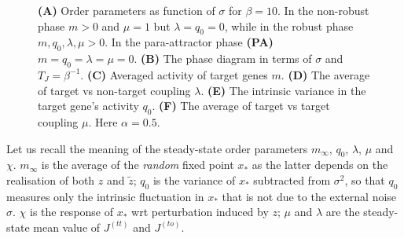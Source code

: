 \documentclass[%
 reprint,
superscriptaddress,
 amsmath,amssymb,
 prl,
]{revtex4-2}
\begin{document}
\begin{figure}
\caption{\textbf{(A)} Order parameters  as function of $\sigma$ for $\beta=10$. In the non-robust phase $m >  0$ and $\mu =1$ but $\lambda = q_0= 0$, while in the robust phase    $m , q_0, \lambda, \mu >0$. In the para-attractor phase \textbf{(PA)}   $m = q_0 = \lambda = \mu=0$. \textbf{(B)} The  phase diagram in terms of $\sigma$ and $T_J =\beta^{-1}$. \textbf{(C)} Averaged activity of target genes $m$.  \textbf{(D)}  The average of target vs non-target coupling $\lambda$.  \textbf{(E)} The intrinsic variance in the  target gene's activity  $q_0$.  \textbf{(F)}  The  average of target vs target coupling $\mu$. Here $\alpha=0.5$.}  %
\label{fig:fig1}
\end{figure}


 Let us recall  the meaning of the steady-state order parameters $m_{\infty}$, $q_0$, $\lambda$, $\mu$ and $\chi$. $m_{\infty}$ is the average of the \emph{random} fixed point $x_*$ as the latter depends on the realisation of both $z$ and $\tilde{z}$; $q_0$ is the variance of $x_*$ subtracted from $\sigma^2$, so that $q_0$ measures only the intrinsic fluctuation in $x_*$ that is not due to  the external noise $\sigma$. $\chi$ is the response of $x_*$ wrt perturbation induced by $z$; $\mu$ and $\lambda$ are the steady-state mean value of $J^{(tt)}$ and $J^{(to)}$. 
 
\end{document}
